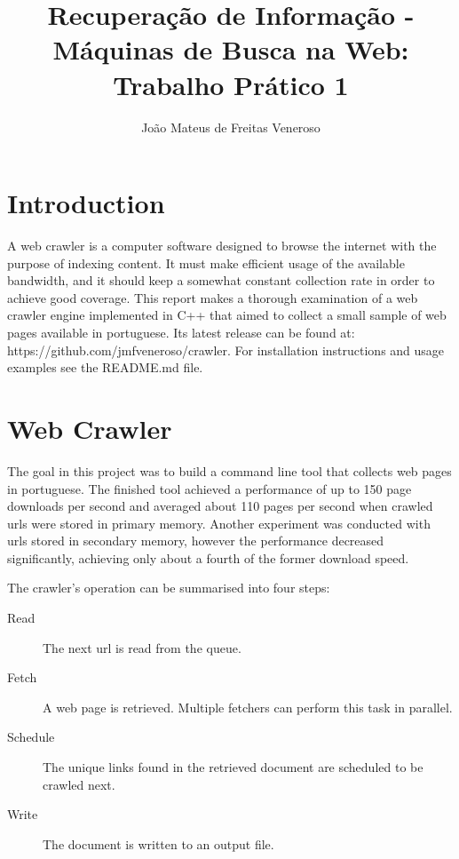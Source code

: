 \documentclass{report}
\begin{document}
\title{Recuperação de Informação - Máquinas de Busca na Web: Trabalho Prático 1}
\author{João Mateus de Freitas Veneroso}

\maketitle

\tableofcontents

\chapter{Introduction}

A web crawler is a computer software designed to browse the internet with the purpose
of indexing content. It must make efficient usage of the available bandwidth,
and it should keep a somewhat constant collection rate in order to achieve good coverage.
This report makes a thorough examination of a web crawler engine implemented
in C++ that aimed to collect a small sample of web pages available in portuguese. 
Its latest release can be found at: 
https://github.com/jmfveneroso/crawler. For installation instructions and usage 
examples see the README.md file. 

\chapter{Web Crawler}
The goal in this project was to build a command line tool that collects web pages in portuguese.
The finished tool achieved a performance of up to 150 page downloads per second and averaged about 110 
pages per second when crawled urls were stored in primary memory. Another experiment was conducted
with urls stored in secondary memory, however the performance decreased significantly, achieving only
about a fourth of the former download speed.

The crawler's operation can be summarised into four steps:

\begin{description}
  \item [Read]     The next url is read from the queue.
  \item [Fetch]    A web page is retrieved. Multiple fetchers can perform this task in parallel.
  \item [Schedule] The unique links found in the retrieved document are scheduled to be crawled next.
  \item [Write]    The document is written to an output file.
\end{description}
\end{document}
